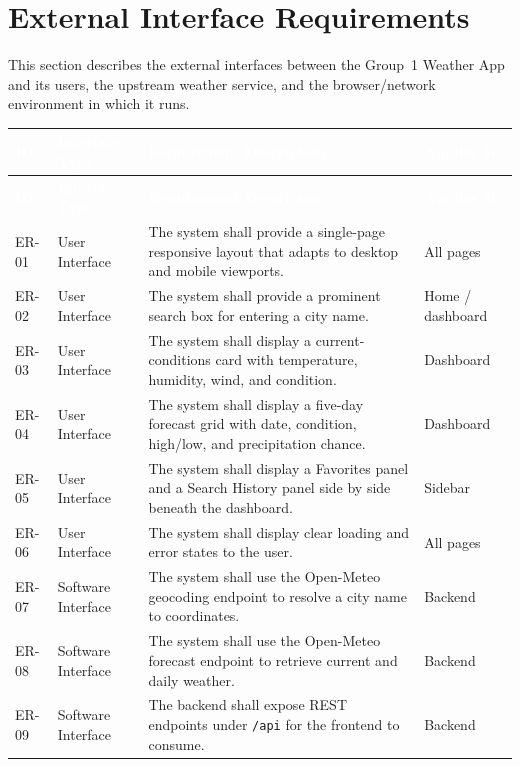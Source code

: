 \documentclass[11pt,letterpaper]{article}
\renewcommand{\arraystretch}{1.25}
\newcommand{\thead}[1]{\textcolor{white}{\bfseries #1}}
\begin{document}
\section{External Interface Requirements}
This section describes the external interfaces between the Group~1 Weather App and its users, the upstream weather service, and the browser/network environment in which it runs.

\renewcommand{\arraystretch}{1.3}
\begin{longtable}{| C{0.55in} | L{1.05in} | L{3.4in} | L{1in} |}
\hline
{}\thead{ID} & \thead{Interface Type} & \thead{Requirement Description} & \thead{Applies To} \\
\hline
\endfirsthead
\hline
{}\thead{ID} & \thead{Interface Type} & \thead{Requirement Description} & \thead{Applies To} \\
\hline
\endhead
ER-01 & User Interface & The system shall provide a single-page responsive layout that adapts to desktop and mobile viewports. & All pages \\ \hline
{}ER-02 & User Interface & The system shall provide a prominent search box for entering a city name. & Home / dashboard \\ \hline
ER-03 & User Interface & The system shall display a current-conditions card with temperature, humidity, wind, and condition. & Dashboard \\ \hline
{}ER-04 & User Interface & The system shall display a five-day forecast grid with date, condition, high/low, and precipitation chance. & Dashboard \\ \hline
ER-05 & User Interface & The system shall display a Favorites panel and a Search History panel side by side beneath the dashboard. & Sidebar \\ \hline
{}ER-06 & User Interface & The system shall display clear loading and error states to the user. & All pages \\ \hline
ER-07 & Software Interface & The system shall use the Open-Meteo geocoding endpoint to resolve a city name to coordinates. & Backend \\ \hline
{}ER-08 & Software Interface & The system shall use the Open-Meteo forecast endpoint to retrieve current and daily weather. & Backend \\ \hline
ER-09 & Software Interface & The backend shall expose REST endpoints under \texttt{/api} for the frontend to consume. & Backend \\ \hline

\end{longtable}
\end{document}
